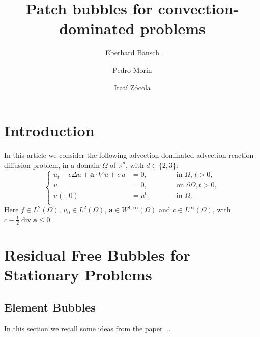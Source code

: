 \documentclass{article}
\title{Patch bubbles for convection-dominated problems}
\author{Eberhard B\"ansch \and Pedro Morin \and Itatí Zócola}
\date{}
\newcommand{\R}{\ensuremath{\mathbb{R}}\xspace}
\newcommand{\aaa}{\ensuremath{\mathbf{a}}\xspace}
\DeclareMathOperator{\Div}{div}
\begin{document}
	\maketitle


\tableofcontents


\section{Introduction}
In this article we consider the following advection dominated advection-reaction-diffusion problem, in a domain $\Omega$ of $\R^d$, with $d\in\{2,3\}$:
\begin{equation*}
    \left\{
\begin{aligned}
    u_t - \epsilon \Delta u + \aaa\cdot \nabla u + c \, u &=0 ,\qquad& &\text{in $\Omega$, $t>0$,}\\
        u &= 0, \qquad& &\text{on $\partial\Omega$}, t>0,\\
    u(\cdot,0) &= u^0, \qquad& & \text{in }\Omega.\\
\end{aligned}
    \right.
\end{equation*}
Here
$f\in L^2(\Omega)$,
$u_0 \in L^2(\Omega)$, 
$\aaa \in W^{1,\infty}(\Omega)$ and $c\in L^\infty(\Omega)$, with 
$c-\frac12 \Div \aaa \le 0$.



\section{Residual Free Bubbles for Stationary Problems}




\subsection{Element Bubbles}


In this section we recall some ideas from the paper~\cite{Brezzi1999}%
.
\end{document}
